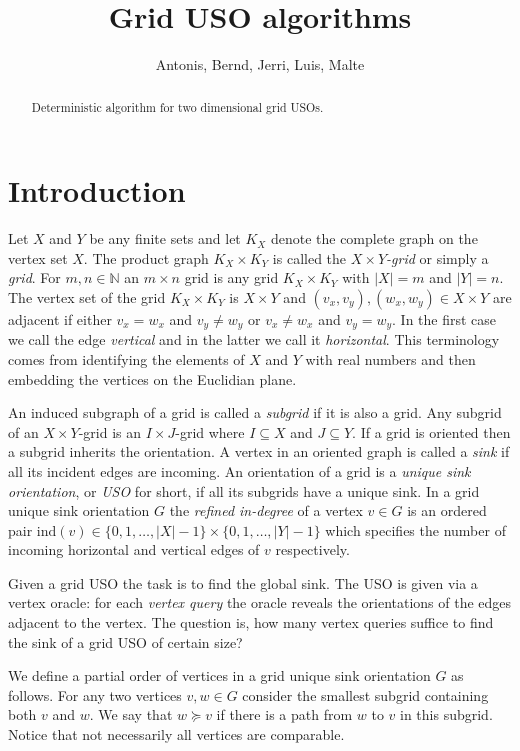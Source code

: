 \documentclass[a4paper,10pt]{article}
\title{Grid USO algorithms}
\author{Antonis, Bernd, Jerri, Luis, Malte}
\newcommand{\indegree}{refined in-degree\xspace}
\newcommand{\ind}{\ensuremath{\mathrm{ind}}}
\begin{document}
\maketitle 

\begin{abstract}
Deterministic algorithm for two dimensional grid USOs.
\end{abstract}

\section{Introduction}

Let $X$ and $Y$ be any finite sets and let $K_X$ denote the complete graph on the vertex set $X$. The product graph $K_X\times K_Y$ is called the \emph{$X\times Y$-grid} or simply a \emph{grid}. For $m,n \in \mathbb{N}$ an $m\times n$ grid is any grid $K_X\times K_Y$ with $|X| = m$ and $|Y| = n$. The vertex set of the grid $K_X\times K_Y$ is $X\times Y$ and $(v_x,v_y),(w_x,w_y) \in X\times Y$ are adjacent if either $v_x = w_x$ and $v_y \not= w_y$ or $v_x \not= w_x$ and $v_y = w_y$. In the first case we call the edge \emph{vertical} and in the latter we call it \emph{horizontal}. This terminology comes from identifying the elements of $X$ and $Y$ with real numbers and then embedding the vertices on the Euclidian plane. 

An induced subgraph of a grid is called a \emph{subgrid} if it is also a grid. Any subgrid of an $X\times Y$-grid is an $I\times J$-grid where $I \subseteq X$ and $J \subseteq Y$. If a grid is oriented then a subgrid inherits the orientation. A vertex in an oriented graph is called a \emph{sink} if all its incident edges are incoming. An orientation of a grid is a \emph{unique sink orientation}, or \emph{USO} for short, if all its subgrids have a unique sink. In a grid unique sink orientation $G$ the \emph{\indegree} of a vertex $v \in G$ is an ordered pair $\ind (v) \in \{0,1,\ldots,|X|-1\}\times \{0,1,\ldots,|Y|-1\}$ which specifies the number of incoming horizontal and vertical edges of $v$ respectively. 

Given a grid USO the task is to find the global sink. The USO is given via a vertex oracle: for each \emph{vertex query} the oracle reveals the orientations of the edges adjacent to the vertex. The question is, how many vertex queries suffice to find the sink of a grid USO of certain size?

We define a partial order of vertices in a grid unique sink orientation $G$ as follows. For any two vertices $v,w \in G$ consider the smallest subgrid containing both $v$ and $w$. We say that $w \succeq v$ if there is a path from $w$ to $v$ in this subgrid. Notice that not necessarily all vertices are comparable.
\end{document}
